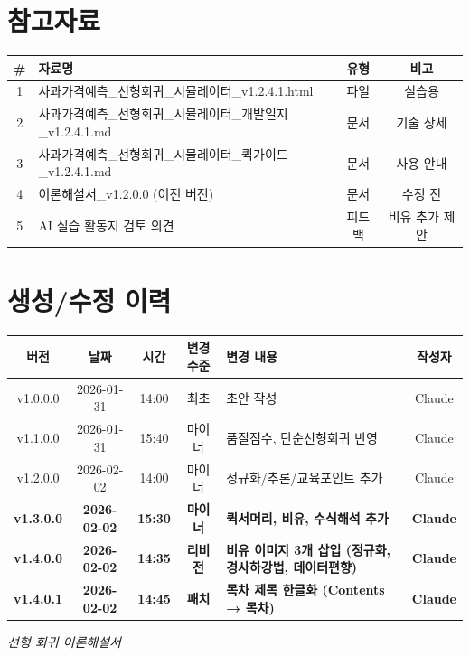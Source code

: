 \documentclass[11pt,a4paper]{article}
\begin{document}
\newpage

\section*{참고자료}

\begin{center}
\renewcommand{\arraystretch}{1.3}
\begin{tabular}{|c|p{7.5cm}|c|c|}
\hline
\rowcolor{tableheader}
\textbf{\#} & \textbf{자료명} & \textbf{유형} & \textbf{비고} \\
\hline
1 & 사과가격예측\_선형회귀\_시뮬레이터\_v1.2.4.1.html & 파일 & 실습용 \\
\hline
2 & 사과가격예측\_선형회귀\_시뮬레이터\_개발일지\_v1.2.4.1.md & 문서 & 기술 상세 \\
\hline
3 & 사과가격예측\_선형회귀\_시뮬레이터\_퀵가이드\_v1.2.4.1.md & 문서 & 사용 안내 \\
\hline
4 & 이론해설서\_v1.2.0.0 (이전 버전) & 문서 & 수정 전 \\
\hline
5 & AI 실습 활동지 검토 의견 & 피드백 & 비유 추가 제안 \\
\hline
\end{tabular}
\end{center}

\vspace{1cm}

\section*{생성/수정 이력}

\begin{center}
\renewcommand{\arraystretch}{1.3}
\begin{tabular}{|c|c|c|c|p{4.5cm}|c|}
\hline
\rowcolor{tableheader}
\textbf{버전} & \textbf{날짜} & \textbf{시간} & \textbf{변경 수준} & \textbf{변경 내용} & \textbf{작성자} \\
\hline
v1.0.0.0 & 2026-01-31 & 14:00 & 최초 & 초안 작성 & Claude \\
\hline
v1.1.0.0 & 2026-01-31 & 15:40 & 마이너 & 품질점수, 단순선형회귀 반영 & Claude \\
\hline
v1.2.0.0 & 2026-02-02 & 14:00 & 마이너 & 정규화/추론/교육포인트 추가 & Claude \\
\hline
\textbf{v1.3.0.0} & \textbf{2026-02-02} & \textbf{15:30} & \textbf{마이너} & \textbf{퀵서머리, 비유, 수식해석 추가} & \textbf{Claude} \\
\hline
\textbf{v1.4.0.0} & \textbf{2026-02-02} & \textbf{14:35} & \textbf{리비전} & \textbf{비유 이미지 3개 삽입 (정규화, 경사하강법, 데이터편향)} & \textbf{Claude} \\
\hline
\textbf{v1.4.0.1} & \textbf{2026-02-02} & \textbf{14:45} & \textbf{패치} & \textbf{목차 제목 한글화 (Contents → 목차)} & \textbf{Claude} \\
\hline
\end{tabular}
\end{center}

\vspace{2cm}

\begin{center}
\textit{\color{lightbrown} 선형 회귀 이론해설서}
\end{center}
\end{document}
